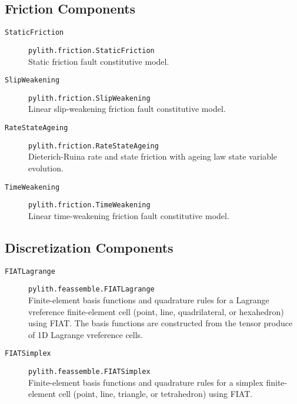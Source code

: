 \subsection{Friction Components}
\begin{description}
\item [{\texttt{StaticFriction}}] \texttt{pylith.friction.StaticFriction}\\
Static friction fault constitutive model.
\item [{\texttt{SlipWeakening}}] \texttt{pylith.friction.SlipWeakening}\\
Linear slip-weakening friction fault constitutive model.
\item [{\texttt{RateStateAgeing}}] \texttt{pylith.friction.RateStateAgeing}\\
Dieterich-Ruina rate and state friction with ageing law state variable
evolution.
\item [{\texttt{TimeWeakening}}] \texttt{pylith.friction.TimeWeakening}\\
Linear time-weakening friction fault constitutive model.
\end{description}

\subsection{Discretization Components}
\begin{description}
\item [{\texttt{FIATLagrange}}] \texttt{pylith.feassemble.FIATLagrange}\\
Finite-element basis functions and quadrature rules for a Lagrange
vreference finite-element cell (point, line, quadrilateral, or hexahedron)
using FIAT. The basis functions are constructed from the tensor produce
of 1D Lagrange vreference cells.
\item [{\texttt{FIATSimplex}}] \texttt{pylith.feassemble.FIATSimplex}\\
Finite-element basis functions and quadrature rules for a simplex
finite-element cell (point, line, triangle, or tetrahedron) using
FIAT.
\end{description}

